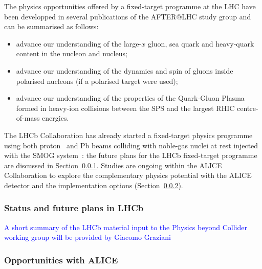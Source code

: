 \documentclass[../report.tex]{subfiles}
\begin{document}
The physics opportunities offered by a fixed-target programme at the LHC have been developped in several publications of the AFTER@LHC study group \cite{Brodsky:2012vg, Lansberg:Adv2015} and can be summarised as follows:
\begin{itemize}
\item advance our understanding of the large-$x$ gluon, sea quark and heavy-quark content in the nucleon and nucleus;
\item advance our understanding of the dynamics and spin of gluons inside polarised nucleons (if a polarised target were used);
\item advance our understanding of the properties of the Quark-Gluon Plasma formed in heavy-ion collisions between the SPS and the largest RHIC centre-of-mass energies.
\end{itemize}
The LHCb Collaboration has already started a fixed-target physics programme using both proton~\cite{Aaij:2018svt,Aaij:2018ogq} and Pb beams colliding with noble-gas nuclei at rest injected with the SMOG system~\cite{SMOG}: the future plans for the LHCb fixed-target programme are discussed in Section~\ref{sec:FTLHCb}. Studies are ongoing within the ALICE Collaboration to explore the complementary physics potential with the ALICE detector and the implementation options (Section~\ref{sec:FTALICE}). 

\subsubsection{Status and future plans in LHCb}
\label{sec:FTLHCb}

\textcolor{blue}{A short summary of the LHCb material input to the Physics beyond Collider working group will be provided by Giacomo Graziani}

\subsubsection{Opportunities with ALICE}
\label{sec:FTALICE}
\end{document}
